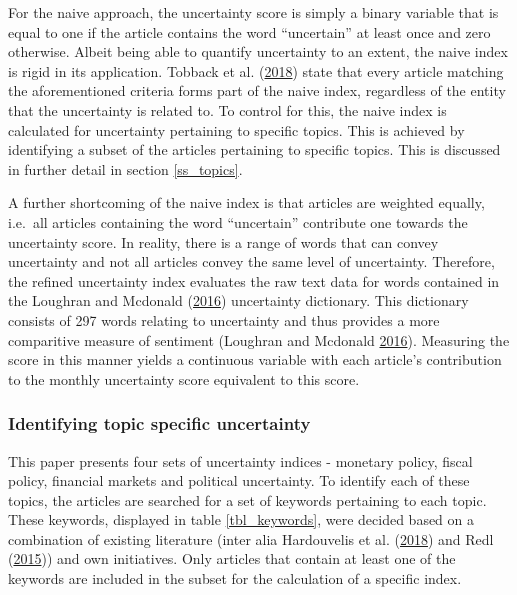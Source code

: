\documentclass[11pt,preprint, authoryear]{elsarticle}
\numberwithin{equation}{section}
\numberwithin{figure}{section}
\numberwithin{table}{section}
\begin{document}
For the naive approach, the uncertainty score is simply a binary
variable that is equal to one if the article contains the word
``uncertain'' at least once and zero otherwise. Albeit being able to
quantify uncertainty to an extent, the naive index is rigid in its
application. Tobback et al. (\protect\hyperlink{ref-Tobback2018}{2018})
state that every article matching the aforementioned criteria forms part
of the naive index, regardless of the entity that the uncertainty is
related to. To control for this, the naive index is calculated for
uncertainty pertaining to specific topics. This is achieved by
identifying a subset of the articles pertaining to specific topics. This
is discussed in further detail in section \ref{ss_topics}.

A further shortcoming of the naive index is that articles are weighted
equally, i.e.~all articles containing the word ``uncertain'' contribute
one towards the uncertainty score. In reality, there is a range of words
that can convey uncertainty and not all articles convey the same level
of uncertainty. Therefore, the refined uncertainty index evaluates the
raw text data for words contained in the Loughran and Mcdonald
(\protect\hyperlink{ref-Loughran2016}{2016}) uncertainty dictionary.
This dictionary consists of 297 words relating to uncertainty and thus
provides a more comparitive measure of sentiment (Loughran and Mcdonald
\protect\hyperlink{ref-Loughran2016}{2016}). Measuring the score in this
manner yields a continuous variable with each article's contribution to
the monthly uncertainty score equivalent to this score.

\subsubsection{\texorpdfstring{Identifying topic specific uncertainty
\label{ss_topics}}{Identifying topic specific uncertainty }}\label{identifying-topic-specific-uncertainty}

This paper presents four sets of uncertainty indices - monetary policy,
fiscal policy, financial markets and political uncertainty. To identify
each of these topics, the articles are searched for a set of keywords
pertaining to each topic. These keywords, displayed in table
\ref{tbl_keywords}, were decided based on a combination of existing
literature (inter alia Hardouvelis et al.
(\protect\hyperlink{ref-Hardouvelis2018}{2018}) and Redl
(\protect\hyperlink{ref-Redl2015}{2015})) and own initiatives. Only
articles that contain at least one of the keywords are included in the
subset for the calculation of a specific index.
\end{document}
